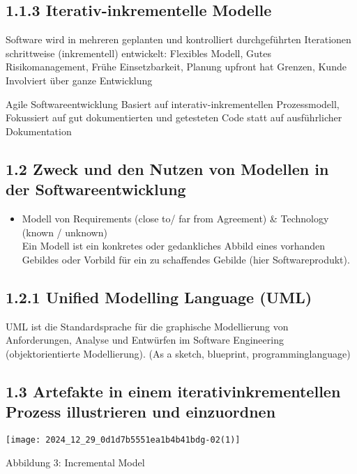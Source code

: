 \subsection*{1.1.3 Iterativ-inkrementelle Modelle}
Software wird in mehreren geplanten und kontrolliert durchgeführten Iterationen schrittweise (inkrementell) entwickelt: Flexibles Modell, Gutes Risikomanagement, Frühe Einsetzbarkeit, Planung upfront hat Grenzen, Kunde Involviert über ganze Entwicklung

Agile Softwareentwicklung Basiert auf interativ-inkrementellen Prozessmodell, Fokussiert auf gut dokumentierten und getesteten Code statt auf ausführlicher Dokumentation

\subsection*{1.2 Zweck und den Nutzen von Modellen in der Softwareentwicklung}
\begin{itemize}
  \item Modell von Requirements (close to/ far from Agreement) \& Technology (known / unknown)\\
Ein Modell ist ein konkretes oder gedankliches Abbild eines vorhanden Gebildes oder Vorbild für ein zu schaffendes Gebilde (hier Softwareprodukt).
\end{itemize}

\subsection*{1.2.1 Unified Modelling Language (UML)}
UML ist die Standardsprache für die graphische Modellierung von Anforderungen, Analyse und Entwürfen im Software Engineering (objektorientierte Modellierung). (As a sketch, blueprint, programminglanguage)

\subsection*{1.3 Artefakte in einem iterativinkrementellen Prozess illustrieren und einzuordnen}
\begin{center}
\texttt{[image: 2024\_12\_29\_0d1d7b5551ea1b4b41bdg-02(1)]}
\end{center}

Abbildung 3: Incremental Model